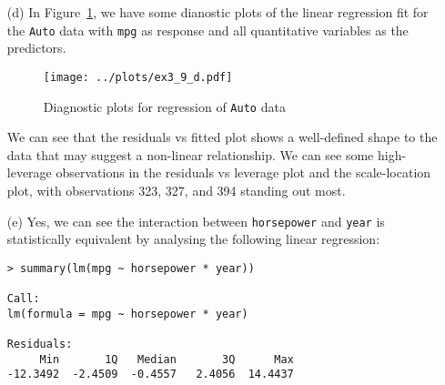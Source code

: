 \begin{itemize}
\begin{verbatim}
Residual standard error: 3.328 on 384 degrees of freedom
Multiple R-squared:  0.8215,    Adjusted R-squared:  0.8182 
F-statistic: 252.4 on 7 and 384 DF,  p-value: < 2.2e-16
        \end{verbatim}\normalsize
        \begin{itemize}
            \item[(i)] Yes, since we have several predictors with low $p$-values
                and/or low standard error relative to the estimate.
            \item[(ii)] The predictors with the most statistically significant
                relationship to the response appear to be \verb|displacement|, 
                \verb|weight|, \verb|year|, and \verb|origin|.
            \item[(iii)] The coefficient of the \verb|year| variable is given
                by 0.750773, suggesting that an increase of 1 year in the model's 
                date of manufacture is associated with an increase of 0.750773 miles
                per gallon in fuel consumption by the vehicle.
        \end{itemize}
    \item[(d)] In Figure~\ref{fig3_9diag}, we have some dianostic plots of the linear 
        regression fit for the \verb|Auto| data with \verb|mpg| as response and all 
        quantitative variables as the predictors.
        \begin{figure}[!ht]
            \texttt{[image: ../plots/ex3\_9\_d.pdf]}
            \caption{Diagnostic plots for regression of \texttt{Auto} data \label{fig3_9diag}}
        \end{figure}
        We can see that the residuals vs fitted plot shows a well-defined shape to the
        data that may suggest a non-linear relationship. We can see some high-leverage
        observations in the residuals vs leverage plot and the scale-location plot, 
        with observations 323, 327, and 394 standing out most.
    \item[(e)] Yes, we can see the interaction between \verb|horsepower| and \verb|year|
        is statistically equivalent by analysing the following linear regression:
        \small\begin{verbatim}
> summary(lm(mpg ~ horsepower * year))

Call:
lm(formula = mpg ~ horsepower * year)

Residuals:
     Min       1Q   Median       3Q      Max 
-12.3492  -2.4509  -0.4557   2.4056  14.4437 


\end{verbatim}
\end{itemize}
